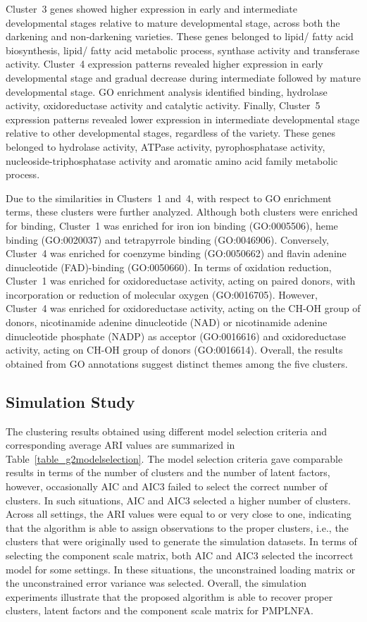 \documentclass[12pt]{article}
\begin{document}
Cluster~3 genes showed higher expression in early and intermediate developmental stages relative to mature developmental stage, across both the darkening and non-darkening varieties. These genes belonged to lipid/ fatty acid biosynthesis, lipid/ fatty acid metabolic process, synthase activity and transferase activity. Cluster~4 expression patterns revealed higher expression in early developmental stage and gradual decrease during intermediate followed by mature developmental stage. GO enrichment analysis identified binding, hydrolase activity, oxidoreductase activity and catalytic activity. Finally, Cluster~5 expression patterns revealed lower expression in intermediate developmental stage relative to other developmental stages, regardless of the variety. These genes belonged to hydrolase activity, ATPase activity, pyrophosphatase activity, nucleoside-triphosphatase activity and aromatic amino acid family metabolic process. 

Due to the similarities in Clusters~1 and~4, with respect to GO enrichment terms, these clusters were further analyzed. Although both clusters were enriched for binding, Cluster~1 was enriched for iron ion binding (GO:0005506), heme binding (GO:0020037) and tetrapyrrole binding (GO:0046906). Conversely, Cluster~4 was enriched for coenzyme binding (GO:0050662) and flavin adenine dinucleotide (FAD)-binding (GO:0050660). In terms of oxidation reduction, Cluster~1 was enriched for oxidoreductase activity, acting on paired donors, with incorporation or reduction of molecular oxygen (GO:0016705). However, Cluster~4 was enriched for oxidoreductase activity, acting on the CH-OH group of donors, nicotinamide adenine dinucleotide (NAD) or nicotinamide adenine dinucleotide phosphate (NADP) as acceptor (GO:0016616) and oxidoreductase activity, acting on CH-OH group of donors (GO:0016614). Overall, the results obtained from GO annotations suggest distinct themes among the five clusters. 

\subsection{Simulation Study}
The clustering results obtained using different model selection criteria and corresponding average ARI values are summarized in Table~\ref{table_g2modelselection}. The model selection criteria gave comparable results in terms of the number of clusters and the number of latent factors, however, occasionally AIC and AIC3 failed to select the correct number of clusters. In such situations, AIC and AIC3 selected a higher number of clusters. Across all settings, the ARI values were equal to or very close to one, indicating that the algorithm is able to assign observations to the proper clusters, i.e., the clusters that were originally used to generate the simulation datasets. In terms of selecting the component scale matrix, both AIC and AIC3 selected the incorrect model for some settings. In these situations, the unconstrained loading matrix or the unconstrained error variance was selected. Overall, the simulation experiments illustrate that the proposed algorithm is able to recover proper clusters, latent factors and the component scale matrix for PMPLNFA.
\end{document}
